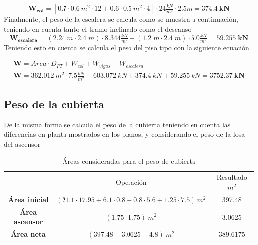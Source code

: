 \documentclass[12pt]{article}
\begin{document}
\begin{equation*}
    \mathbf{W_{col}}=[0.7\cdot0.6~m^{2}\cdot12+0.6\cdot0.5~m^{2}\cdot4]\cdot 24 \tfrac{kN}{m^{3}} \cdot 2.5 m=\mathbf{374.4~kN}
\end{equation*}
Finalmente, el peso de la escalera se calcula como se muestra a continuación, teniendo en cuenta tanto el tramo inclinado como el descanso
\begin{equation*}
    \mathbf{W_{escalera}}=(2.24\;m \cdot 2.4\;m )\cdot 8.344 \tfrac{kN}{m^2}+(1.2\;m \cdot 2.4\;m)\cdot 5.0 \tfrac{kN}{m^2} =\mathbf{59.255\;kN}
\end{equation*}
Teniendo esto en cuenta se calcula el peso del piso tipo con la siguiente ecuación

\begin{gather*}
    \mathbf{W}=Area\cdot D_{PT}+W_{col}+W_{vigas}+W_{escalera}\\
    \mathbf{W}=362.012~m^{2}\cdot 7.5\tfrac{kN}{m^{2}}+603.072~kN+374.4~kN+59.255~kN=\mathbf{3752.37~kN}
\end{gather*}

\subsection{Peso de la cubierta}

De la misma forma se calcula el peso de la cubierta teniendo en cuenta las diferencias en planta mostrados en los planos, y considerando el peso de la losa del ascensor

\begin{table}[H]
  \centering
    \begin{tabular}{|c|c|c|}
    \hline
    \rowcolor[rgb]{ .2,  .247,  .31} \multicolumn{3}{|c|}{\textcolor[rgb]{ 1,  1,  1}{\textbf{Áreas}}} \bigstrut\\
    \hline
    \rowcolor[rgb]{ .2,  .247,  .31} \multicolumn{1}{|c|}{\textcolor[rgb]{ 1,  1,  1}{Elemento}} & \multicolumn{1}{c|}{\textcolor[rgb]{ 1,  1,  1}{Operación }} & \multicolumn{1}{c|}{\textcolor[rgb]{ 1,  1,  1}{Resultado $m^{2}$}} \bigstrut[b]\\
    \hline
    \rowcolor[rgb]{ .2,  .247,  .31} \textcolor[rgb]{ 1,  1,  1}{\textbf{Área inicial}} & \cellcolor[rgb]{ 1,  1,  1}$(21.1\cdot17.95+6.1\cdot0.8+0.8\cdot5.6+1.25\cdot7.5)~m^{2}$ & \cellcolor[rgb]{ 1,  1,  1}397.48 \bigstrut\\
    \hline
    \rowcolor[rgb]{ .2,  .247,  .31} \textcolor[rgb]{ 1,  1,  1}{\textbf{Área ascensor}} & \cellcolor[rgb]{ 1,  1,  1}$(1.75\cdot1.75)~m^{2}$ & \cellcolor[rgb]{ 1,  1,  1}3.0625 \bigstrut\\
    \hline
    \rowcolor[rgb]{ .2,  .247,  .31} \textcolor[rgb]{ 1,  1,  1}{\textbf{Área neta}} & \cellcolor[rgb]{ 1,  1,  1}$(397.48-3.0625-4.8)~m^{2}$ & \cellcolor[rgb]{ 1,  1,  1}389.6175 \bigstrut\\
    \hline
    \end{tabular}%
  \caption{Áreas consideradas para el peso de cubierta}
  \label{tab:ÁreasPisoCubierta}%
\end{table}%
\end{document}
